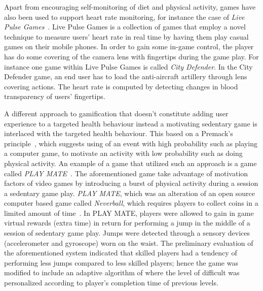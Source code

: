 Apart from encouraging self-monitoring of diet and physical activity, games have also been used to support heart rate monitoring, for instance the case of \emph{Live Pulse Games}~\citep{han2014designing,han2015balancing}. Live Pulse Games is a collection of games that employ a novel technique to measure users' heart rate in real time by having them play casual games on their mobile phones. In order to gain some in-game control, the player has do some covering of the camera lens with fingertips during the game play. For instance one game within Live Pulse Games is called \emph{City Defender}. In the City Defender game, an end user has to load the anti-aircraft artillery through lens covering actions. The heart rate is computed by detecting changes  in  blood transparency  of users’ fingertips.
 
A different approach to gamification that doesn't constitute adding user experience to a targeted health behaviour instead a motivating sedentary game is interlaced with the targeted health behaviour. This based on a Premack's principle~\citep{premack1959toward}, which suggests using of an event with high probability such as playing a computer game, to motivate an activity with low probability such as doing physical activity. An example of a game that utilized such an approach is a game called \emph{PLAY MATE}~\citep{berkovsky2010physical,berkovsky2012physical}. The aforementioned game take advantage of motivation factors of video games by introducing a burst of physical activity during a session a sedentary game play. \emph{PLAY MATE}, which was an alteration of an open source computer based game called \emph{Neverball}, which requires players to collect coins in a limited amount of time~\citep{berkovsky2012physical}. In PLAY MATE, players were allowed to gain in game virtual rewards (extra time) in return for performing a jump in the middle of a session of sedentary game play. Jumps were detected through a sensory devices (accelerometer and gyroscope) worn on the waist. The preliminary evaluation of the aforementioned system indicated that skilled players had a tendency of performing less jumps compared to less skilled players; hence the game was modified to include an adaptive algorithm of where the level of difficult was personalized according to player's completion time of previous levels.

